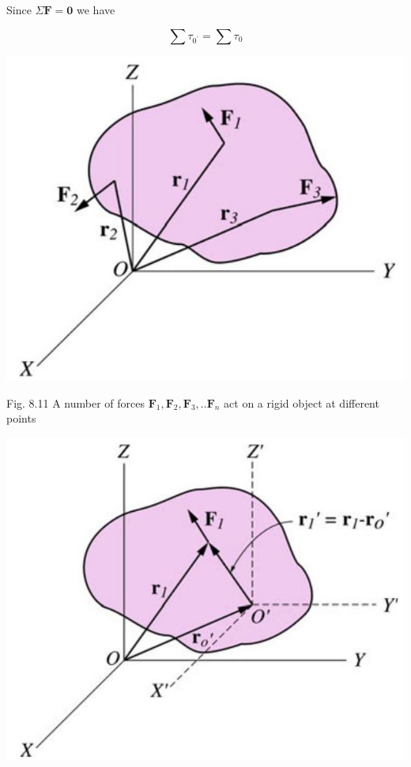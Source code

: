 \documentclass[10pt]{article}
\begin{document}
Since $\Sigma \mathbf{F}=\mathbf{0}$ we have

$$
\sum \tau_{0^{\prime}}=\sum \tau_{0}
$$

\begin{center}
\includegraphics[max width=\textwidth]{2024_09_13_db1f357d2aad0a03eb2eg-136}
\end{center}

Fig. 8.11 A number of forces $\mathbf{F}_{1}, \mathbf{F}_{2}, \mathbf{F}_{3}, . . \mathbf{F}_{n}$ act on a rigid object at different points

\begin{center}
\includegraphics[max width=\textwidth]{2024_09_13_db1f357d2aad0a03eb2eg-136(3)}
\end{center}
\end{document}
